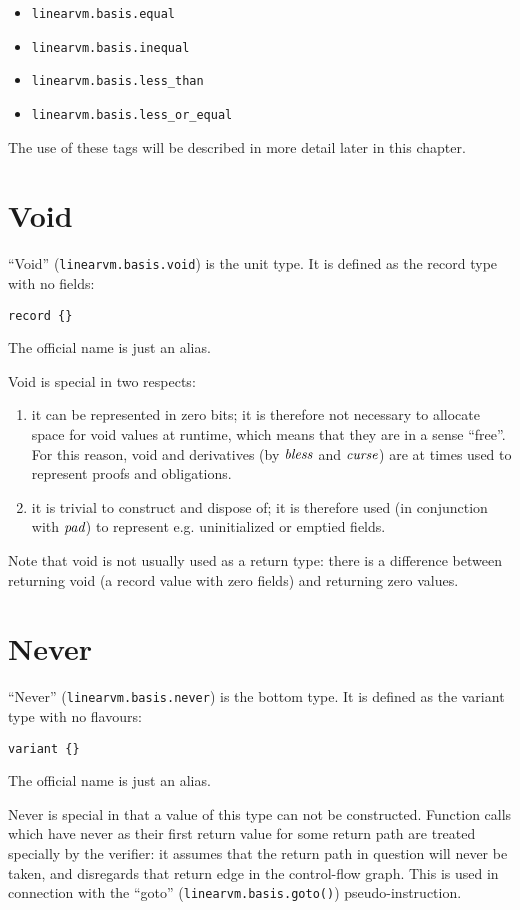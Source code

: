 \documentclass[a4paper]{book}
\newcommand\tyBless{{\ensuremath{\textnormal{\textit{bless}}}}}
\newcommand\tyCurse{{\ensuremath\textit{curse}}}
\newcommand\tyPad{{\ensuremath\textit{pad}}}
\begin{document}
\begin{itemize}
\item \texttt{linearvm.basis.equal}
\item \texttt{linearvm.basis.inequal}
\item \texttt{linearvm.basis.less\_than}
\item \texttt{linearvm.basis.less\_or\_equal}
\end{itemize}

The use of these tags will be described in more detail later in this chapter.

\section{Void}
``Void'' (\texttt{linearvm.basis.void}) is the unit type.
It is defined as the record type with no fields:
\begin{center}
  \verb|record {}|
\end{center}
The official name is just an alias.

Void is special in two respects:
\begin{enumerate}
\item it can be represented in zero bits;
  it is therefore not necessary to allocate space for void values at
  runtime, which means that they are in a sense ``free''.
  For this reason, void and derivatives (by $\tyBless$ and
  $\tyCurse$) are at times used to represent proofs and obligations.
\item it is trivial to construct and dispose of;
  it is therefore used (in conjunction with $\tyPad$) to represent e.g.
  uninitialized or emptied fields.
\end{enumerate}

Note that void is not usually used as a return type: there is a
difference between returning void (a record value with zero fields)
and returning zero values.

\section{Never}
``Never'' (\texttt{linearvm.basis.never}) is the bottom type.
It is defined as the variant type with no flavours:
\begin{center}
  \verb|variant {}|
\end{center}
The official name is just an alias.

Never is special in that a value of this type can not be constructed.
Function calls which have never as their first return value for some return
path are treated specially by the verifier: it assumes that the return
path in question will never be taken, and disregards that return edge
in the control-flow graph.
This is used in connection with the ``goto'' (\texttt{linearvm.basis.goto()})
pseudo-instruction.
\end{document}
